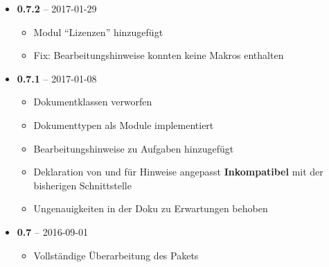 \begin{itemize}
\begin{itemize}
        \item Modul \enquote{Bewertung} hinzugefügt
        \item Dokumententyp \enquote{Leitprogramm} hinzugefügt
        \item Dokumententyp \enquote{Folie} hinzugefügt
      \end{itemize}
  \item \textbf{0.7.2} -- 2017-01-29
      \begin{itemize}
        \item Modul \enquote{Lizenzen} hinzugefügt
        \item Fix: Bearbeitungshinweise konnten keine Makros enthalten
      \end{itemize}
  \item \textbf{0.7.1} -- 2017-01-08
      \begin{itemize}
        \item Dokumentklassen verworfen
        \item Dokumenttypen als Module implementiert
        \item Bearbeitungshinweise zu Aufgaben hinzugefügt
        \item Deklaration von  und  für Hinweise angepasst \textbf{Inkompatibel} mit der bisherigen Schnittstelle
        \item Ungenauigkeiten in der Doku zu Erwartungen behoben
      \end{itemize}
  \item \textbf{0.7} -- 2016-09-01
      \begin{itemize}
        \item Vollständige Überarbeitung des Pakets
      \end{itemize}
\end{itemize}
